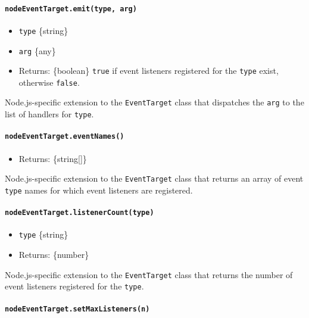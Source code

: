 \paragraph{\texorpdfstring{\texttt{nodeEventTarget.emit(type,\ arg)}}{nodeEventTarget.emit(type, arg)}}\label{nodeeventtarget.emittype-arg}

\begin{itemize}
\tightlist
\item
  \texttt{type} \{string\}
\item
  \texttt{arg} \{any\}
\item
  Returns: \{boolean\} \texttt{true} if event listeners registered for
  the \texttt{type} exist, otherwise \texttt{false}.
\end{itemize}

Node.js-specific extension to the \texttt{EventTarget} class that
dispatches the \texttt{arg} to the list of handlers for \texttt{type}.

\paragraph{\texorpdfstring{\texttt{nodeEventTarget.eventNames()}}{nodeEventTarget.eventNames()}}\label{nodeeventtarget.eventnames}

\begin{itemize}
\tightlist
\item
  Returns: \{string{[}{]}\}
\end{itemize}

Node.js-specific extension to the \texttt{EventTarget} class that
returns an array of event \texttt{type} names for which event listeners
are registered.

\paragraph{\texorpdfstring{\texttt{nodeEventTarget.listenerCount(type)}}{nodeEventTarget.listenerCount(type)}}\label{nodeeventtarget.listenercounttype}

\begin{itemize}
\item
  \texttt{type} \{string\}
\item
  Returns: \{number\}
\end{itemize}

Node.js-specific extension to the \texttt{EventTarget} class that
returns the number of event listeners registered for the \texttt{type}.

\paragraph{\texorpdfstring{\texttt{nodeEventTarget.setMaxListeners(n)}}{nodeEventTarget.setMaxListeners(n)}}\label{nodeeventtarget.setmaxlistenersn}

